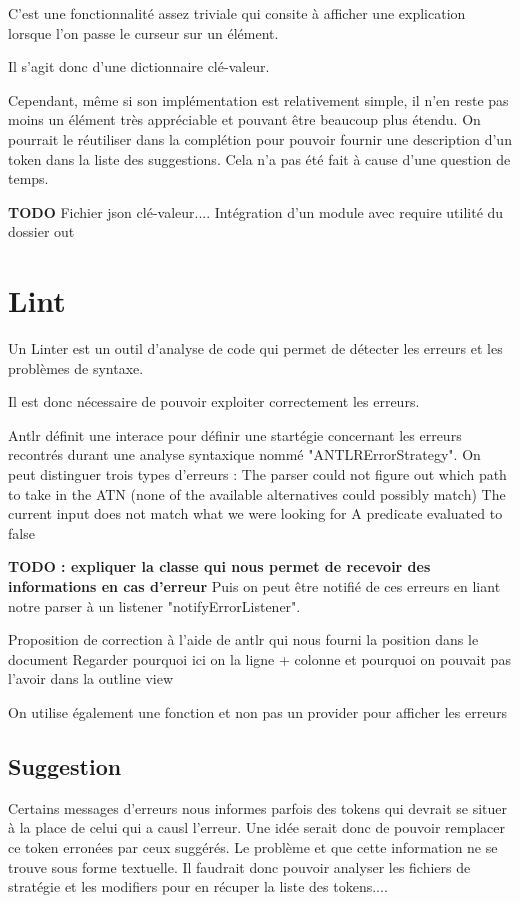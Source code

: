 \documentclass[
    iict, %
    il, %
]{heig-tb}
\begin{document}
C'est une fonctionnalité assez triviale qui consite à afficher une explication lorsque l'on passe le curseur sur un élément.

Il s'agit donc d'une dictionnaire clé-valeur.

Cependant, même si son implémentation est relativement simple, il n'en reste pas moins un élément très appréciable et pouvant être beaucoup plus étendu.
On pourrait le réutiliser dans la complétion pour pouvoir fournir une description d'un token dans la liste des suggestions.
Cela n'a pas été fait à cause d'une question de temps.

\textbf{TODO}
Fichier json clé-valeur....
Intégration d'un module avec require
utilité du dossier out

\section{Lint}

Un Linter est un outil d'analyse de code qui permet de détecter les erreurs et les problèmes de syntaxe.

Il est donc nécessaire de pouvoir exploiter correctement les erreurs.

Antlr définit une interace pour définir une startégie concernant les erreurs recontrés durant une analyse syntaxique nommé "ANTLRErrorStrategy".
On peut distinguer trois types d'erreurs :
The parser could not figure out which path to take in the ATN (none of the available alternatives could possibly match)
The current input does not match what we were looking for
A predicate evaluated to false

\textbf{TODO : expliquer la classe qui nous permet de recevoir des informations en cas d'erreur}
Puis on peut être notifié de ces erreurs en liant notre parser à un listener "notifyErrorListener".

Proposition de correction à l'aide de antlr qui nous fourni la position dans le document
Regarder pourquoi ici on la ligne + colonne et pourquoi on pouvait pas l'avoir dans la outline view

On utilise également une fonction et non pas un provider pour afficher les erreurs


\subsection{Suggestion}
Certains messages d'erreurs nous informes parfois des tokens qui devrait se situer à la place de celui qui a causl l'erreur.
Une idée serait donc de pouvoir remplacer ce token erronées par ceux suggérés.
Le problème et que cette information ne se trouve sous forme textuelle.
Il faudrait donc pouvoir analyser les fichiers de stratégie et les modifiers pour en récuper la liste des tokens....
\end{document}
